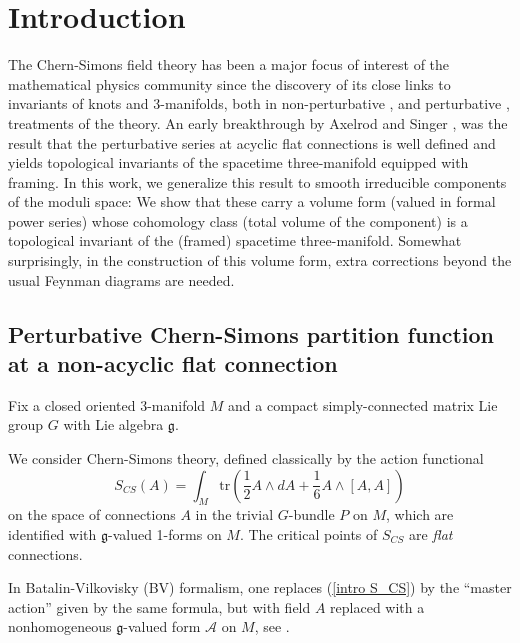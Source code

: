 \documentclass[11pt,a4paper]{amsart}
\theoremstyle{plain} %
\theoremstyle{definition}
\theoremstyle{remark}
\newcommand{\g}{\mathfrak{g}}
\newcommand{\mr}{\mathrm}
\newcommand{\mc}{\mathcal}
\begin{document}
\section{Introduction}
The Chern-Simons field theory has been a major focus of interest of the mathematical physics community since the discovery of its close links to invariants of knots and 3-manifolds,
both in non-perturbative \cite{Witten1989}, \cite{Reshetikhin1991} and perturbative \cite{Froehlich1989}, \cite{Kontsevich1993} treatments of the theory. 
An early breakthrough by Axelrod and Singer \cite{Axelrod1991}, \cite{Axelrod1994} was the result that the perturbative series at acyclic flat connections is well defined and yields topological invariants of the spacetime three-manifold equipped with framing. In this work, we generalize this result to smooth irreducible components of the moduli space: We show that these carry a volume form (valued in formal power series) %
whose cohomology class (total volume of the component)
is a topological invariant of the (framed) spacetime three-manifold. 
Somewhat surprisingly, in the construction of this volume form, extra corrections beyond the usual Feynman diagrams are needed.


\subsection{Perturbative Chern-Simons partition function at a non-acyclic flat connection}
Fix a closed oriented 3-manifold $M$ and a compact simply-connected matrix Lie group $G$ with Lie algebra $\g$. %

We consider Chern-Simons theory, defined classically by the action functional
\begin{equation}\label{intro S_CS}
    S_{CS}(A)=\int_M \mr{tr} \left( \frac12 A\wedge dA +\frac16 A\wedge [A,A]  \right)
\end{equation}
on the space of connections $A$ in the trivial $G$-bundle $P$ on $M$, which are identified with $\g$-valued 1-forms on $M$. The critical points of $S_{CS}$ are \textit{flat} connections.

In Batalin-Vilkovisky (BV) formalism, one replaces (\ref{intro S_CS}) by the ``master action'' given by the same formula, but with field 
$A$ replaced with a nonhomogeneous $\g$-valued form  $\mc{A}$ on $M$, see \cite{Alexandrov1997}.
\end{document}
